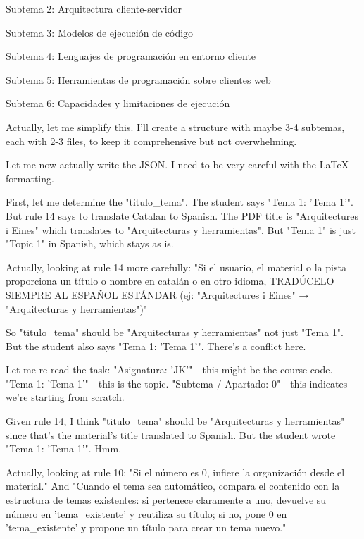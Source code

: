 Subtema 2: Arquitectura cliente-servidor

Subtema 3: Modelos de ejecución de código

Subtema 4: Lenguajes de programación en entorno cliente

Subtema 5: Herramientas de programación sobre clientes web

Subtema 6: Capacidades y limitaciones de ejecución

Actually, let me simplify this. I'll create a structure with maybe 3-4 subtemas, each with 2-3 files, to keep it comprehensive but not overwhelming.

Let me now actually write the JSON. I need to be very careful with the LaTeX formatting.

First, let me determine the "titulo\_tema". The student says "Tema 1: 'Tema 1'". But rule 14 says to translate Catalan to Spanish. The PDF title is "Arquitectures i Eines" which translates to "Arquitecturas y herramientas". But "Tema 1" is just "Topic 1" in Spanish, which stays as is.

Actually, looking at rule 14 more carefully: "Si el usuario, el material o la pista proporciona un título o nombre en catalán o en otro idioma, TRADÚCELO SIEMPRE AL ESPAÑOL ESTÁNDAR (ej: "Arquitectures i Eines" → "Arquitecturas y herramientas")"

So "titulo\_tema" should be "Arquitecturas y herramientas" not just "Tema 1". But the student also says "Tema 1: 'Tema 1'". There's a conflict here.

Let me re-read the task: "Asignatura: 'JK'" - this might be the course code. "Tema 1: 'Tema 1'" - this is the topic. "Subtema / Apartado: 0" - this indicates we're starting from scratch.

Given rule 14, I think "titulo\_tema" should be "Arquitecturas y herramientas" since that's the material's title translated to Spanish. But the student wrote "Tema 1: 'Tema 1'". Hmm.

Actually, looking at rule 10: "Si el número es 0, infiere la organización desde el material." And "Cuando el tema sea automático, compara el contenido con la estructura de temas existentes: si pertenece claramente a uno, devuelve su número en 'tema\_existente' y reutiliza su título; si no, pone 0 en 'tema\_existente' y propone un título para crear un tema nuevo."


